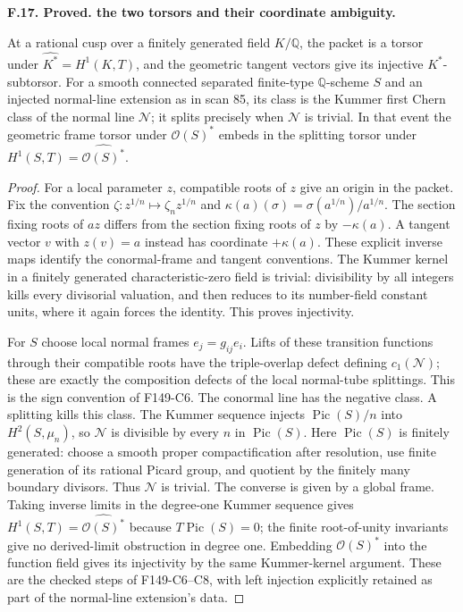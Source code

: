 \documentclass[11pt,oneside]{article}
\makeatletter
\newcounter{statementanchor}
\newenvironment{statement}[3]{%
 \refstepcounter{statementanchor}\def\@currentlabel{#1}%
 \par\addvspace{9pt}\noindent
 \textbf{#1. #2. #3.}\par\nobreak\noindent\ignorespaces
}{\par\addvspace{5pt}}
\makeatother
\begin{document}
\begin{statement}{F.17}{Proved}{the two torsors and their coordinate ambiguity}
\label{st:F.17}
\label{F-torsors}
At a rational cusp over a finitely generated field $K/\mathbb Q$, the packet is a torsor
under $\widehat{K^*}=H^1(K,T)$, and the geometric tangent vectors
give its injective $K^*$-subtorsor. For a smooth connected separated
finite-type $\mathbb Q$-scheme $S$ and an injected normal-line
extension as in scan 85, its class is the Kummer first Chern class
of the normal line $\mathcal N$; it splits precisely when
$\mathcal N$ is trivial. In that event the geometric frame torsor
under $\mathcal O(S)^*$ embeds in the splitting torsor under
$H^1(S,T)=\widehat{\mathcal O(S)^*}$.
\end{statement}
\begin{proof}
For a local parameter $z$, compatible roots of $z$ give an origin
in the packet. Fix the convention
$\zeta:z^{1/n}\mapsto\zeta_nz^{1/n}$ and
$\kappa(a)(\sigma)=\sigma(a^{1/n})/a^{1/n}$.
The section fixing roots of $az$ differs from the section fixing
roots of $z$ by $-\kappa(a)$. A tangent vector $v$ with
$z(v)=a$ instead has coordinate $+\kappa(a)$. These explicit
inverse maps identify the conormal-frame and tangent conventions.
The Kummer kernel in
a finitely generated characteristic-zero field is trivial:
divisibility by all integers kills every divisorial valuation,
and then reduces to its number-field constant units, where it
again forces the identity. This proves injectivity.

For $S$ choose local normal frames $e_j=g_{ij}e_i$. Lifts of these
transition functions through their compatible roots have the
triple-overlap defect defining $c_1(\mathcal N)$; these are exactly
the composition defects of the local normal-tube splittings.
This is the sign convention of F149-C6. The conormal line has
the negative class. A splitting kills this class. The Kummer
sequence injects $\operatorname{Pic}(S)/n$ into
$H^2(S,\mu_n)$, so $\mathcal N$ is divisible by every $n$ in
$\operatorname{Pic}(S)$. Here $\operatorname{Pic}(S)$ is finitely
generated: choose a smooth proper compactification after
resolution, use finite generation of its rational Picard group,
and quotient by the finitely many boundary divisors. Thus
$\mathcal N$ is trivial. The converse is given by a global frame.
Taking inverse limits in the degree-one Kummer sequence gives
$H^1(S,T)=\widehat{\mathcal O(S)^*}$ because
$T\operatorname{Pic}(S)=0$; the finite root-of-unity invariants
give no derived-limit obstruction in degree one. Embedding
$\mathcal O(S)^*$ into the function field gives its injectivity
by the same Kummer-kernel argument. These are the checked steps
of F149-C6--C8, with left injection explicitly retained as part
of the normal-line extension's data.
\end{proof}
\end{document}
